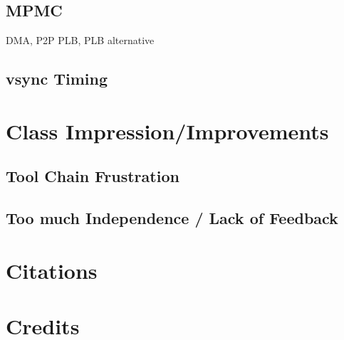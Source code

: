 \documentclass[letterpaper,10pt]{article}
\begin{document}
\subsection{MPMC}
DMA, P2P PLB, PLB alternative

\subsection{vsync Timing}

\section{Class Impression/Improvements}

\subsection{Tool Chain Frustration}
\subsection{Too much Independence / Lack of Feedback}

\section{Citations}





\section{Credits}





\end{document}
